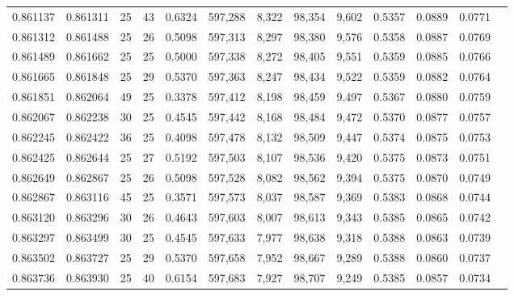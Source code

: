 \begin{tabular}{rrrrrrrrrrrrr}
0.861137 & 0.861311 &    25 &  43 &                                     0.6324 & 597,288 &   8,322 &  98,354 &   9,602 & 0.5357 & 0.0889 & 0.0771 \\
0.861312 & 0.861488 &    25 &  26 &                                     0.5098 & 597,313 &   8,297 &  98,380 &   9,576 & 0.5358 & 0.0887 & 0.0769 \\
0.861489 & 0.861662 &    25 &  25 &                                     0.5000 & 597,338 &   8,272 &  98,405 &   9,551 & 0.5359 & 0.0885 & 0.0766 \\
0.861665 & 0.861848 &    25 &  29 &                                     0.5370 & 597,363 &   8,247 &  98,434 &   9,522 & 0.5359 & 0.0882 & 0.0764 \\
0.861851 & 0.862064 &    49 &  25 &                                     0.3378 & 597,412 &   8,198 &  98,459 &   9,497 & 0.5367 & 0.0880 & 0.0759 \\
0.862067 & 0.862238 &    30 &  25 &                                     0.4545 & 597,442 &   8,168 &  98,484 &   9,472 & 0.5370 & 0.0877 & 0.0757 \\
0.862245 & 0.862422 &    36 &  25 &                                     0.4098 & 597,478 &   8,132 &  98,509 &   9,447 & 0.5374 & 0.0875 & 0.0753 \\
0.862425 & 0.862644 &    25 &  27 &                                     0.5192 & 597,503 &   8,107 &  98,536 &   9,420 & 0.5375 & 0.0873 & 0.0751 \\
0.862649 & 0.862867 &    25 &  26 &                                     0.5098 & 597,528 &   8,082 &  98,562 &   9,394 & 0.5375 & 0.0870 & 0.0749 \\
0.862867 & 0.863116 &    45 &  25 &                                     0.3571 & 597,573 &   8,037 &  98,587 &   9,369 & 0.5383 & 0.0868 & 0.0744 \\
0.863120 & 0.863296 &    30 &  26 &                                     0.4643 & 597,603 &   8,007 &  98,613 &   9,343 & 0.5385 & 0.0865 & 0.0742 \\
0.863297 & 0.863499 &    30 &  25 &                                     0.4545 & 597,633 &   7,977 &  98,638 &   9,318 & 0.5388 & 0.0863 & 0.0739 \\
0.863502 & 0.863727 &    25 &  29 &                                     0.5370 & 597,658 &   7,952 &  98,667 &   9,289 & 0.5388 & 0.0860 & 0.0737 \\
0.863736 & 0.863930 &    25 &  40 &                                     0.6154 & 597,683 &   7,927 &  98,707 &   9,249 & 0.5385 & 0.0857 & 0.0734 \\

\end{tabular}
